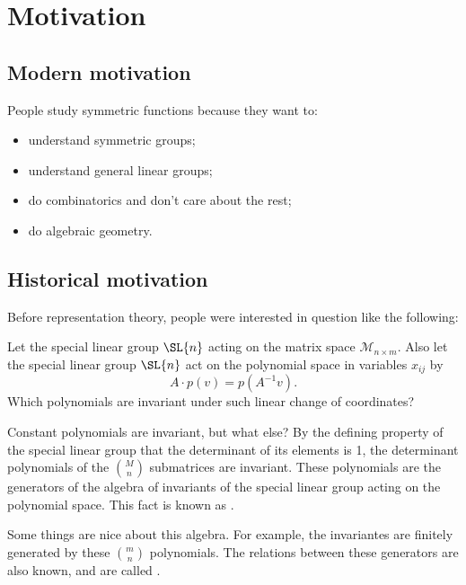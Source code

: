 \chapter{Motivation}

\section{Modern motivation}

People study symmetric functions because they want to:
\begin{itemize}
    \item understand symmetric groups;
    \item understand general linear groups;
    \item do combinatorics and don't care about the rest;
    \item do algebraic geometry.
\end{itemize}

\section{Historical motivation}

Before representation theory, people were interested in question like the following:

\begin{question}
    Let the special linear group \(\SL{n}\) acting on the matrix space \(\mathcal{M}_{n \times m}\).
    Also let the special linear group \(\SL{n}\) act on the polynomial space in variables \(x_{ij}\) by
    \begin{equation}
        A \cdot p(v) = p(A^{-1}v).
    \end{equation}
    Which polynomials are invariant under such linear change of coordinates?
\end{question}

Constant polynomials are invariant, but what else?
By the defining property of the special linear group that the determinant of its elements is 1,
the determinant polynomials of the \(\binom{M}{n}\) submatrices are invariant.
These polynomials are the generators of the algebra of invariants of the special linear group acting on the polynomial space.
This fact is known as .

Some things are nice about this algebra.
For example, the invariantes are finitely generated by these \(\binom{m}{n}\) polynomials.
The relations between these generators are also known,
and are called .

